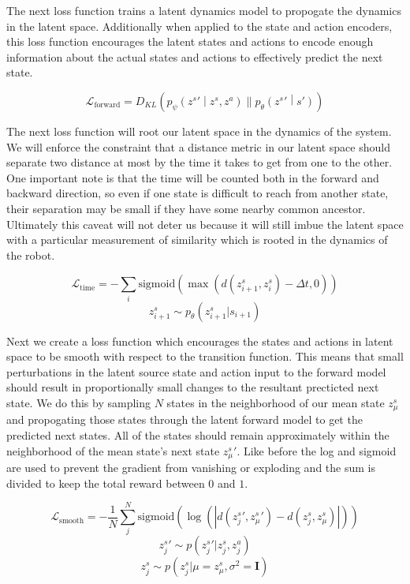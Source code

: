 \documentclass{article}
\begin{document}
The next loss function trains a latent dynamics model to propogate the dynamics in the latent space.
Additionally when applied to the state and action encoders, this loss function encourages the latent states and actions to encode enough information about the actual states and actions to effectively predict the next state.

$$\mathcal{L}_{\text{forward}} = D_{KL}\left( p_\psi\left({z^s}'\middle|z^s,z^a\right) \parallel p_\theta\left({z^s}'\middle| s'\right) \right)$$


The next loss function will root our latent space in the dynamics of the system.
We will enforce the constraint that a distance metric in our latent space should separate two distance at most by the time it takes to get from one to the other.
One important note is that the time will be counted both in the forward and backward direction, so even if one state is difficult to reach from another state, their separation may be small if they have some nearby common ancestor.
Ultimately this caveat will not deter us because it will still imbue the latent space with a particular measurement of similarity which is rooted in the dynamics of the robot.

$$\mathcal{L}_\text{time} = -\sum\limits_i \text{sigmoid}(\max(d(z^s_{i+1},z^s_i) - \Delta t, 0))$$
$$z^s_{i+1} \sim p_\theta(z^s_{i+1}|s_{i+1})$$


Next we create a loss function which encourages the states and actions in latent space to be smooth with respect to the transition function.
This means that small perturbations in the latent source state and action input to the forward model should result in proportionally small changes to the resultant precticted next state.
We do this by sampling $N$ states in the neighborhood of our mean state $z_\mu^s$ and propogating those states through the latent forward model to get the predicted next states.
All of the states should remain approximately within the neighborhood of the mean state's next state ${z_\mu^s}'$.
Like before the log and sigmoid are used to prevent the gradient from vanishing or exploding and the sum is divided to keep the total reward between $0$ and $1$.

$$\mathcal{L}_\text{smooth} = -\frac{1}{N}\sum\limits_j^N \text{sigmoid}(\log(|d({z^s_j}', {z^s_\mu}') - d({z^s_j}, {z^s_\mu})|))$$
$${z^s_j}' \sim p({z^s_j}'|z^s_j,z^a_j)$$
$$z^s_j \sim p(z^s_j | \mu=z^s_\mu, \sigma^2=\mathbf{I})$$
\end{document}

